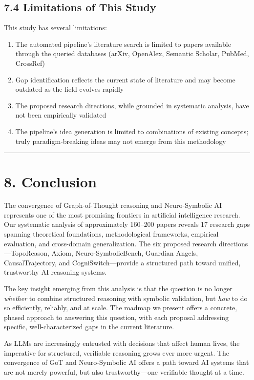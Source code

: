 \documentclass[11pt,a4paper]{article}
\begin{document}
\subsection{7.4 Limitations of This Study}

This study has several limitations:
\begin{enumerate}
  \item The automated pipeline's literature search is limited to papers available through the queried databases (arXiv, OpenAlex, Semantic Scholar, PubMed, CrossRef)
  \item Gap identification reflects the current state of literature and may become outdated as the field evolves rapidly
  \item The proposed research directions, while grounded in systematic analysis, have not been empirically validated
  \item The pipeline's idea generation is limited to combinations of existing concepts; truly paradigm-breaking ideas may not emerge from this methodology
\end{enumerate}

\noindent\rule{\textwidth}{0.4pt}

\section{8. Conclusion}

The convergence of Graph-of-Thought reasoning and Neuro-Symbolic AI represents one of the most promising frontiers in artificial intelligence research. Our systematic analysis of approximately 160–200 papers reveals 17 research gaps spanning theoretical foundations, methodological frameworks, empirical evaluation, and cross-domain generalization. The six proposed research directions—TopoReason, Axiom, Neuro-SymbolicBench, Guardian Angels, CausalTrajectory, and CogniSwitch—provide a structured path toward unified, trustworthy AI reasoning systems.

The key insight emerging from this analysis is that the question is no longer \textit{whether} to combine structured reasoning with symbolic validation, but \textit{how} to do so efficiently, reliably, and at scale. The roadmap we present offers a concrete, phased approach to answering this question, with each proposal addressing specific, well-characterized gaps in the current literature.

As LLMs are increasingly entrusted with decisions that affect human lives, the imperative for structured, verifiable reasoning grows ever more urgent. The convergence of GoT and Neuro-Symbolic AI offers a path toward AI systems that are not merely powerful, but also trustworthy—one verifiable thought at a time.
\end{document}
